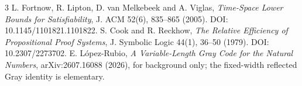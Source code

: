 \documentclass[11pt]{article}
\begin{document}
\begin{thebibliography}{3}
 L. Fortnow, R. Lipton, D. van Melkebeek and A. Viglas, \emph{Time-Space Lower Bounds for Satisfiability}, J. ACM 52(6), 835--865 (2005). DOI: 10.1145/1101821.1101822.
 S. Cook and R. Reckhow, \emph{The Relative Efficiency of Propositional Proof Systems}, J. Symbolic Logic 44(1), 36--50 (1979). DOI: 10.2307/2273702.
 E. L\'opez-Rubio, \emph{A Variable-Length Gray Code for the Natural Numbers}, arXiv:2607.16088 (2026), for background only; the fixed-width reflected Gray identity is elementary.
\end{thebibliography}
\end{document}
